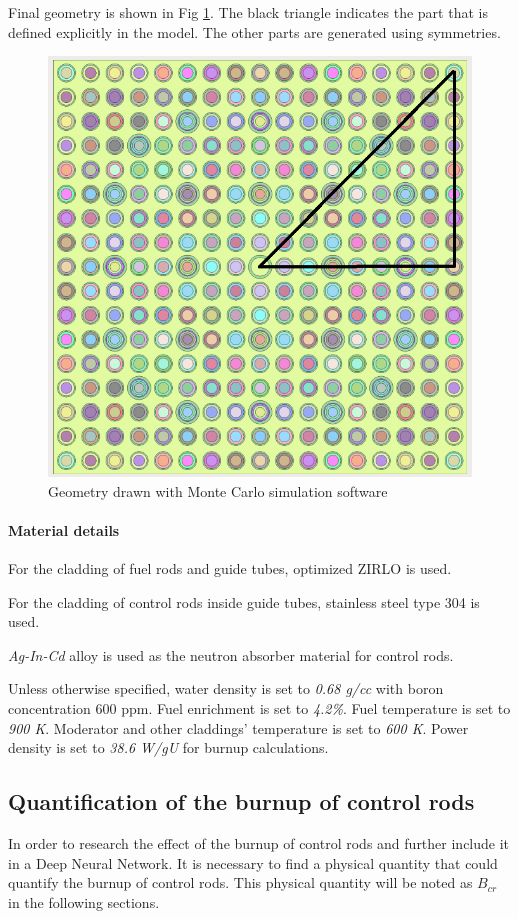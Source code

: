Final geometry is shown in Fig \ref{fig:geo}.
The black triangle indicates the part that is defined explicitly in the model.
The other parts are generated using symmetries.
\begin{figure}[!htb]
    \centering\includegraphics[width=0.5\linewidth]{Figs/model.png}
    \caption{Geometry drawn with Monte Carlo simulation software}
    \label{fig:geo}
\end{figure}


\paragraph{Material details}
\label{sec:material_details}
For the cladding of fuel rods and guide tubes, optimized ZIRLO is used.

For the cladding of control rods inside guide tubes, stainless steel type 304 is used.

\textit{Ag-In-Cd} alloy is used as the neutron absorber material for control rods.

Unless otherwise specified, water density is set to \textit{0.68 g/cc} with boron concentration 600 ppm.
Fuel enrichment is set to \textit{4.2\%}.
Fuel temperature is set to \textit{900 K}.
Moderator and other claddings' temperature is set to \textit{600 K}.
Power density is set to \textit{38.6 W/gU} for burnup calculations.



\subsection{Quantification of the burnup of control rods}
\label{sec:quantification_methods}

In order to research the effect of the burnup of control rods and further
include it in a Deep Neural Network.
It is necessary to find a physical quantity that could quantify the burnup of control rods.
This physical quantity will be noted as $ B_{cr} $ in the following sections.

